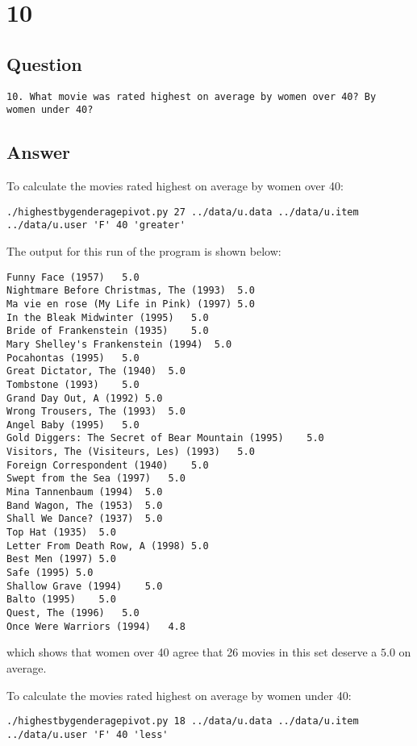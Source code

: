 \documentclass[letterpaper,11pt]{article}
\begin{document}
\newpage

\section*{10}

\subsection*{Question}

\begin{verbatim}
10. What movie was rated highest on average by women over 40? By
women under 40?
\end{verbatim}

\newpage
\subsection*{Answer}

To calculate the movies rated highest on average by women over 40:
\begin{lstlisting}[frame=single]
./highestbygenderagepivot.py 27 ../data/u.data ../data/u.item ../data/u.user 'F' 40 'greater'
\end{lstlisting}

The output for this run of the program is shown below:
\begin{lstlisting}[frame=single]
Funny Face (1957)	5.0
Nightmare Before Christmas, The (1993)	5.0
Ma vie en rose (My Life in Pink) (1997)	5.0
In the Bleak Midwinter (1995)	5.0
Bride of Frankenstein (1935)	5.0
Mary Shelley's Frankenstein (1994)	5.0
Pocahontas (1995)	5.0
Great Dictator, The (1940)	5.0
Tombstone (1993)	5.0
Grand Day Out, A (1992)	5.0
Wrong Trousers, The (1993)	5.0
Angel Baby (1995)	5.0
Gold Diggers: The Secret of Bear Mountain (1995)	5.0
Visitors, The (Visiteurs, Les) (1993)	5.0
Foreign Correspondent (1940)	5.0
Swept from the Sea (1997)	5.0
Mina Tannenbaum (1994)	5.0
Band Wagon, The (1953)	5.0
Shall We Dance? (1937)	5.0
Top Hat (1935)	5.0
Letter From Death Row, A (1998)	5.0
Best Men (1997)	5.0
Safe (1995)	5.0
Shallow Grave (1994)	5.0
Balto (1995)	5.0
Quest, The (1996)	5.0
Once Were Warriors (1994)	4.8
\end{lstlisting}
which shows that women over 40 agree that 26 movies in this set deserve a $5.0$ on average.

To calculate the movies rated highest on average by women under 40:
\begin{lstlisting}[frame=single]
./highestbygenderagepivot.py 18 ../data/u.data ../data/u.item ../data/u.user 'F' 40 'less'
\end{lstlisting}
\end{document}
